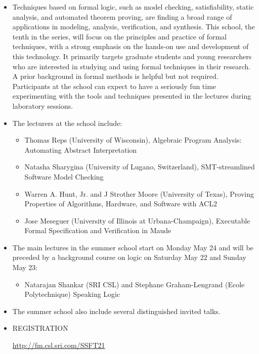 \documentclass[prodmode,acmtecs]{acmsmall} %
\begin{document}
\begin{itemize}\item  Techniques based on formal logic, such as model checking, satisfiability, static analysis, and automated theorem proving, are finding a broad range of applications in modeling, analysis, verification, and synthesis. This school, the tenth in the series, will focus on the principles and practice of formal techniques, with a strong emphasis on the hands-on use and development of this technology. It primarily targets graduate students and young researchers who are interested in studying and using formal techniques in their research. A prior background in formal methods is helpful but not required. Participants at the school can expect to have a seriously fun time experimenting with the tools and techniques presented in the lectures during laboratory sessions. 
 
\item  The lecturers at  the school include: 
 
\begin{itemize}\item  Thomas Reps (University of Wisconsin), Algebraic Program Analysis: Automating Abstract Interpretation
\item  Natasha Sharygina (University of Lugano, Switzerland), SMT-streamlined Software Model Checking
\item  Warren A. Hunt, Jr. and J Strother Moore (University of Texas), Proving Properties of Algorithms, Hardware, and Software with ACL2
\item  Jose Meseguer (University of Illinois at Urbana-Champaign), Executable Formal Specification and Verification in Maude
\end{itemize} 
\item  The main lectures in the summer school start on Monday May 24 and will be preceded by a background course on logic on Saturday May 22 and Sunday May 23: 
 
\begin{itemize}\item  Natarajan Shankar (SRI CSL) and Stephane Graham-Lengrand (Ecole Polytechnique) Speaking Logic
\end{itemize} 
\item  The summer school also include several distinguished invited talks.  
 
\item  REGISTRATION 
 
  \href{http://fm.csl.sri.com/SSFT21}{http://fm.csl.sri.com/SSFT21} 
 

\end{itemize}
\end{document}
